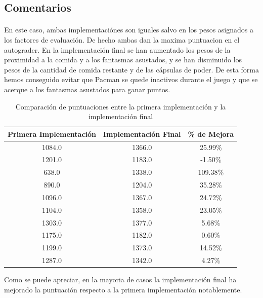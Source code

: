 \documentclass{report}
\begin{document}
        \subsection*{Comentarios}
          \paragraph*{}{
            En este caso, ambas implementaciónes son iguales salvo en los pesos asignados a los factores de evaluación. 
            De hecho ambas dan la maxima puntuacion en el autograder.
            En la implementación final se han aumentado los pesos de la proximidad a la comida y a los fantasmas asustados, y se han disminuido los pesos de la cantidad de comida restante y de las cápsulas de poder.
            De esta forma hemos conseguido evitar que Pacman se quede inactivos durante el juego y que se acerque a los fantasmas asustados para ganar puntos.
            \begin{table}[H]
                \centering
                \begin{tabular}{|c|c|c|}
                    \hline
                    \textbf{Primera Implementación} & \textbf{Implementación Final} & \textbf{\% de Mejora} \\ \hline
                    1084.0 & 1366.0 & 25.99\% \\ \hline
                    1201.0 & 1183.0 & -1.50\% \\ \hline
                    638.0 & 1338.0 & 109.38\% \\ \hline
                    890.0 & 1204.0 & 35.28\% \\ \hline
                    1096.0 & 1367.0 & 24.72\% \\ \hline
                    1104.0 & 1358.0 & 23.05\% \\ \hline
                    1303.0 & 1377.0 & 5.68\% \\ \hline
                    1175.0 & 1182.0 & 0.60\% \\ \hline
                    1199.0 & 1373.0 & 14.52\% \\ \hline
                    1287.0 & 1342.0 & 4.27\% \\ \hline
                \end{tabular}
                \caption{Comparación de puntuaciones entre la primera implementación y la implementación final}
                \label{tab:comparison}
            \end{table}
            Como se puede apreciar, en la mayoria de casos la implementación final ha mejorado la puntuación respecto a la primera implementación notablemente.  
        }      
\end{document}
